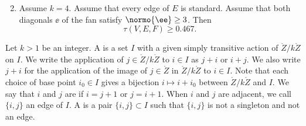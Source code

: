 \begin{theorem}
\begin{enumerate}
\begin{equation}
\end{equation}
\item Assume $k=4$.  Assume that every edge of $E$ is standard.
Assume that both diagonals $\ee$ of the fan satisfy $\normo{\ee}\ge3$.
Then
\begin{equation}
\tau(V,E,F)\ge 0.467.\tag{check:quad\_diag\_cs}
\end{equation}
\end{enumerate}
\end{theorem}

%
%




\begin{definition}
  Let $k>1$ be an integer.  A  is a set $I$ with a
  given simply transitive action of $\ring{Z}/k\ring{Z}$ on $I$.  We
  write the application of $j\in\ring{Z}/k\ring{Z}$ to $i\in I$ as
  $j+i$ or $i+j$.  We also write $j+i$
  for the application of the image of $j\in\ring{Z}$ in $\ring{Z}/k\ring{Z}$ to
  $i\in I$.  Note that each choice of base point $i_0\in I$ gives a
  bijection $i\mapsto i+i_0$ between $\ring{Z}/k\ring{Z}$ and $I$.  
  We say that $i$ and $j$ are  if $i= j+ 1$ or $j=i+1$.
When $i$ and $j$ are adjacent, we call $\{i,j\}$ an edge of $I$.
 A  is a pair $\{i,j\}\subset I$
such that $\{i,j\}$ is not a singleton and not an edge.
%
\end{definition}

